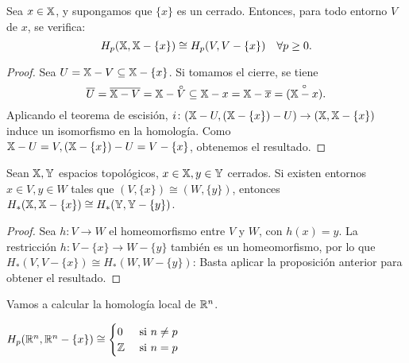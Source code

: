 \begin{proposition}
  Sea $x \in {\mathbb X}$, y supongamos que $\{x\}$ es un cerrado. Entonces, para todo entorno $V$ de $x$, se verifica:
  \[ H_p({\mathbb X}, {\mathbb X} - \{x\}) \cong H_p(V, V - \{x\}) \quad \forall p \geq 0. \]
\end{proposition}

\begin{proof}
  Sea $U = {\mathbb X} - V \subseteq {\mathbb X} - \{x\}$. Si tomamos el cierre, se tiene
  \[ \overline{U} = \overline{\X - V} = \X - \interior{V} \subseteq \X - x = \X - \overline{x} = \interior{(\X - x)} .\]
  Aplicando el teorema de escisión, $i \colon ({\mathbb X} - U, ({\mathbb X} - \{x\}) - U) \to ({\mathbb X}, {\mathbb X} - \{x\})$ induce un isomorfismo en la homología.
  Como ${\mathbb X} - U = V, ({\mathbb X} - \{x\}) - U = V - \{x\}$, obtenemos el resultado.
\end{proof}

\begin{proposition}
  Sean ${\mathbb X}, {\mathbb Y}$ espacios topológicos, $x \in {\mathbb X}, y \in {\mathbb Y}$ cerrados. Si existen entornos $x \in V, y \in W$ tales que $(V, \{x\}) \cong (W, \{y\})$,
  entonces $H_*({\mathbb X}, {\mathbb X} - \{x\}) \cong H_*({\mathbb Y}, {\mathbb Y} - \{y\})$.
\end{proposition}

\begin{proof}
  Sea $h \colon V \to W$ el homeomorfismo entre $V$ y $W$, con $h(x) = y$. La restricción $h \colon V - \{x\} \to W - \{y\}$ también es un homeomorfismo,
  por lo que $H_*(V, V - \{x\}) \cong H_*(W, W - \{y\})$: Basta aplicar la proposición anterior para obtener el resultado.
\end{proof}

Vamos a calcular la homología local de $\mathbb{R}^n$.

\begin{proposition}
  $H_p(\mathbb{R}^n, \mathbb{R}^n - \{x\}) \cong \begin{cases} 0 &\text{ si } n \neq p \\ \mathbb{Z} &\text{ si } n = p \end{cases}$
\end{proposition}

